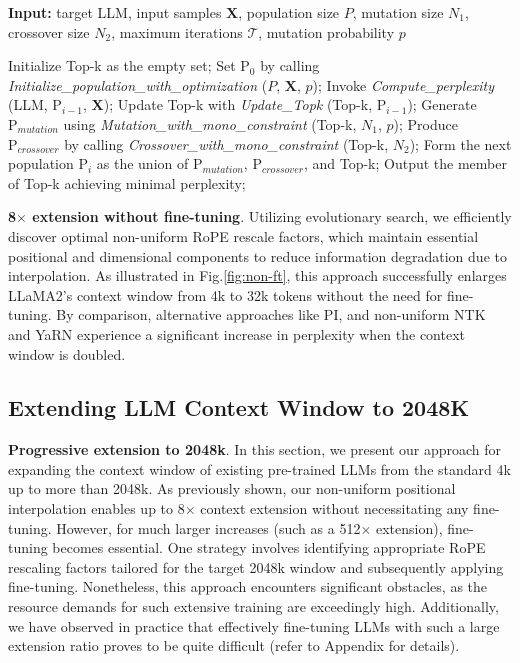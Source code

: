 \begin{algorithm}[t]
	\small
	\caption{The search algorithm}
	\textbf{Input:} target LLM, input samples $\mathbf{X}$, population size $P$, mutation size $N_1$, crossover size $N_2$, maximum iterations $\mathcal{T}$, mutation probability $p$\\

	\begin{algorithmic}[1]
		\label{alg:search}
		\STATE Initialize Top-k as the empty set;	
		\STATE Set $\text{P}_0$ by calling \textit{Initialize\_population\_with\_optimization} ($P$, $\mathbf{X}$, $p$); 
		\STATE Invoke \textit{Compute\_perplexity} (LLM, $\text{P}_{i-1}$, $\mathbf{X}$);
		\STATE  Update Top-k with \textit{Update\_Topk} (Top-k, $\text{P}_{i-1}$);
		\STATE Generate $\text{P}_{mutation}$ using \textit{Mutation\_with\_mono\_constraint} (Top-k, $N_1$, $p$); 
		\STATE Produce $\text{P}_{crossover}$ by calling \textit{Crossover\_with\_mono\_constraint} (Top-k, $N_2$);
		\STATE Form the next population $\text{P}_i$ as the union of $\text{P}_{mutation}$, $\text{P}_{crossover}$, and Top-k;
		\ENDFOR
		\STATE Output the member of Top-k achieving minimal perplexity;
	\end{algorithmic}
\end{algorithm}

\textbf{8$\times$ extension without fine-tuning}. Utilizing evolutionary search, we efficiently discover optimal non-uniform RoPE rescale factors, which maintain essential positional and dimensional components to reduce information degradation due to interpolation. As illustrated in Fig.\ref{fig:non-ft}, this approach successfully enlarges LLaMA2’s context window from 4k to 32k tokens without the need for fine-tuning. By comparison, alternative approaches like PI, and non-uniform NTK and YaRN experience a significant increase in perplexity when the context window is doubled.

\subsection{Extending LLM Context Window to 2048K}
\label{sec:extendto2048k}

\textbf{Progressive extension to 2048k}. In this section, we present our approach for expanding the context window of existing pre-trained LLMs from the standard 4k up to more than 2048k. As previously shown, our non-uniform positional interpolation enables up to 8$\times$ context extension without necessitating any fine-tuning. However, for much larger increases (such as a 512$\times$ extension), fine-tuning becomes essential. One strategy involves identifying appropriate RoPE rescaling factors tailored for the target 2048k window and subsequently applying fine-tuning. Nonetheless, this approach encounters significant obstacles, as the resource demands for such extensive training are exceedingly high. Additionally, we have observed in practice that effectively fine-tuning LLMs with such a large extension ratio proves to be quite difficult (refer to Appendix for details).

